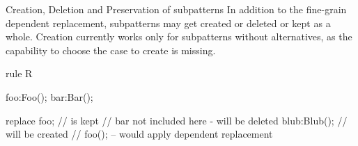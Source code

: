 Creation, Deletion and Preservation of subpatterns
In addition to the fine-grain dependent replacement, 
subpatterns may get created or deleted or kept as a whole.
Creation currently works only for subpatterns without alternatives,
as the capability to choose the case to create is missing.

\begin{example}
  \begin{grgen}
rule R {
  foo:Foo();
  bar:Bar();

  replace {
    foo; // is kept
    // bar not included here - will be deleted
    blub:Blub(); // will be created
    // foo(); -- would apply dependent replacement
  }
}
  \end{grgen}
\end{example}

